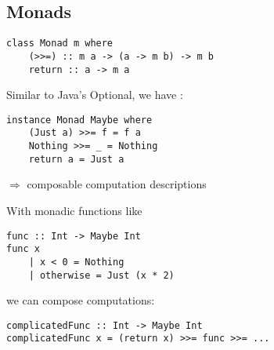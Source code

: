 \subsection{Monads}

\begin{lstlisting}[frame=htrbl]
class Monad m where
	(>>=) :: m a -> (a -> m b) -> m b
	return :: a -> m a
\end{lstlisting}

Similar to Java's Optional, we have :
\begin{lstlisting}[frame=htrbl]
instance Monad Maybe where
	(Just a) >>= f = f a
	Nothing >>= _ = Nothing
	return a = Just a
\end{lstlisting}

$\Rightarrow$ composable computation descriptions

\frbreak

With monadic functions like
\begin{lstlisting}[frame=htrbl]
func :: Int -> Maybe Int
func x
	| x < 0 = Nothing
	| otherwise = Just (x * 2)
\end{lstlisting}
we can compose computations:
\begin{lstlisting}[frame=htrbl]
complicatedFunc :: Int -> Maybe Int
complicatedFunc x = (return x) >>= func >>= ...
\end{lstlisting}